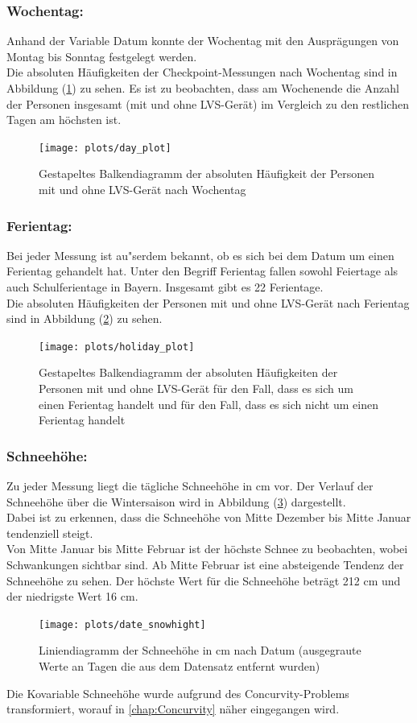 \documentclass[12pt]{scrreprt}
\begin{document}
\newpage
\subsubsection*{Wochentag:}
Anhand der Variable Datum konnte der Wochentag mit den Ausprägungen von Montag bis Sonntag festgelegt werden. \\
Die absoluten Häufigkeiten der Checkpoint-Messungen nach Wochentag sind in Abbildung (\ref{pic:day_plot}) zu sehen. Es ist zu beobachten, dass am Wochenende die Anzahl der Personen insgesamt (mit und ohne LVS-Gerät) im Vergleich zu den restlichen Tagen am höchsten ist. 
\begin{figure}[H]
	\centering
	\texttt{[image: plots/day\_plot]}
	\caption{Gestapeltes Balkendiagramm der absoluten Häufigkeit der Personen mit und ohne LVS-Gerät nach Wochentag}
	\label{pic:day_plot}	
\end{figure}

\newpage
\subsubsection*{Ferientag:}
Bei jeder Messung ist au"serdem bekannt, ob es sich bei dem Datum um einen Ferientag gehandelt hat. Unter den Begriff Ferientag fallen sowohl Feiertage als auch Schulferientage in Bayern. Insgesamt gibt es 22 Ferientage. \\
Die absoluten Häufigkeiten der Personen mit und ohne LVS-Gerät nach Ferientag sind in Abbildung (\ref{pic:holiday_plot}) zu sehen.
\begin{figure}[H]
	\centering
	\texttt{[image: plots/holiday\_plot]}
	\caption{Gestapeltes Balkendiagramm der absoluten Häufigkeiten der Personen mit und ohne LVS-Gerät für den Fall, dass es sich um einen Ferientag handelt und für den Fall, dass es sich nicht um einen Ferientag handelt}
	\label{pic:holiday_plot}	
\end{figure}

\newpage
\subsubsection{Schneehöhe:}
Zu jeder Messung liegt die tägliche Schneehöhe in cm vor. Der Verlauf der Schneehöhe über die Wintersaison wird in Abbildung (\ref{pic:date_snowhight}) dargestellt. \\
Dabei ist zu erkennen, dass die Schneehöhe von Mitte Dezember bis Mitte Januar tendenziell steigt. \\
Von Mitte Januar bis Mitte Februar ist der höchste Schnee zu beobachten, wobei Schwankungen sichtbar sind. Ab Mitte Februar ist eine absteigende Tendenz der Schneehöhe zu sehen. Der höchste Wert für die Schneehöhe beträgt 212 cm und der niedrigste Wert 16 cm. 
\begin{figure}[H]
	\centering
	\texttt{[image: plots/date\_snowhight]}
	\caption{Liniendiagramm der Schneehöhe in cm nach Datum (ausgegraute Werte an Tagen die aus dem Datensatz entfernt wurden)}
	\label{pic:date_snowhight}	
\end{figure}
\noindent Die Kovariable Schneehöhe wurde aufgrund des Concurvity-Problems transformiert, worauf in \autoref{chap:Concurvity} näher eingegangen wird.
  
\end{document}
